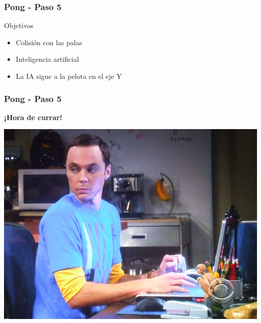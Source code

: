 \begin{frame}
	\frametitle{Pong - Paso 5}
	
	\begin{block}{Objetivos}
		\begin{itemize}
			\item Colisión con las palas
			\item Inteligencia artificial
			\item La IA sigue a la pelota en el eje Y
		\end{itemize}            
	\end{block}

\end{frame}

\begin{frame}
	\frametitle{Pong - Paso 5}
	
    \begin{center}
        \textbf{¡Hora de currar!}
    \end{center}
	
    \begin{center}
		\includegraphics[scale=0.3]{img/currar-5.jpg}
	\end{center}	

\end{frame}

